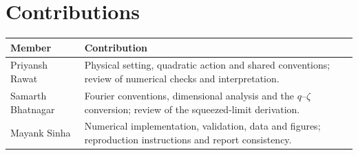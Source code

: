 \documentclass[11pt,a4paper]{article}
\begin{document}
\newpage
\section{Contributions}
\begin{center}
\begin{tabularx}{\linewidth}{p{34mm}X}
\toprule
Member & Contribution\\\midrule
Priyansh Rawat & Physical setting, quadratic action and shared conventions; review of numerical checks and interpretation.\\[3mm]
Samarth Bhatnagar & Fourier conventions, dimensional analysis and the $q$--$\zeta$ conversion; review of the squeezed-limit derivation.\\[3mm]
Mayank Sinha & Numerical implementation, validation, data and figures; reproduction instructions and report consistency.\\
\bottomrule
\end{tabularx}
\end{center}
\end{document}

